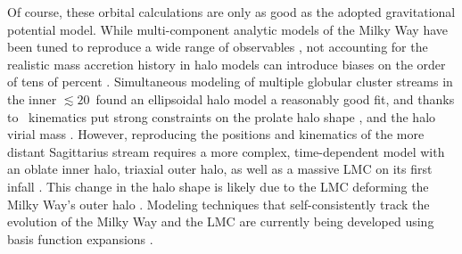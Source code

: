 \documentclass[final,5p,times,twocolumn,authoryear]{elsarticle}
\begin{document}
Of course, these orbital calculations are only as good as the adopted gravitational potential model.
While multi-component analytic models of the Milky Way have been tuned to reproduce a wide range of observables \citep[e.g.,][]{bovy:2015, mcmillan:2017,price-whelan:2017}, not accounting for the realistic mass accretion history in halo models can introduce biases on the order of tens of percent \citep[e.g.,][]{bonaca:2014, dsouza:2022, arora:2022, santistevan:2024}.
Simultaneous modeling of multiple globular cluster streams in the inner $\lesssim20$\,\unit{\kpc} found an ellipsoidal halo model a reasonably good fit, and thanks to \gaia\ kinematics put strong constraints on the prolate halo shape \citep[$q_z=1.06\pm0.06$;][]{palau:2023}, and the halo virial mass \citep[$M_{200}=1.09^{+0.19}_{-0.14}\times10^{12}\,\unit{\msun}$;][see also \citealt{reino:2021}]{ibata:2023}.
However, reproducing the positions and kinematics of the more distant Sagittarius stream requires a more complex, time-dependent model with an oblate inner halo, triaxial outer halo, as well as a massive LMC on its first infall \citep{vasiliev:2021,kang:2023}.
This change in the halo shape is likely due to the LMC deforming the Milky Way's outer halo \citep[e.g.,][]{garavito-camargo:2019,shao:2021,vasiliev:2023}.
Modeling techniques that self-consistently track the evolution of the Milky Way and the LMC are currently being developed using basis function expansions \citep[e.g.,][]{sanders:2020,garavito-camargo:2021,lilleengen:2023}.
\end{document}
